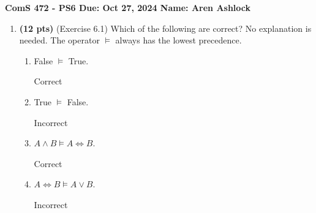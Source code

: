 \documentclass{article}
\begin{document}
\noindent\textbf{ComS 472 - PS6 \quad Due: Oct 27, 2024 \quad Name: Aren Ashlock}

\begin{enumerate}


\item \textbf{(12 pts)} (Exercise 6.1) Which of the following are correct? No explanation is needed. The operator $\models$ always has the lowest precedence.

    \begin{enumerate}[label=($\alph*$)]


    \item False $\models$ True.

    \color{blue}
        Correct
    \color{black}



    \item True $\models$ False.

    \color{blue}
        Incorrect
    \color{black}



    \item $A \wedge B \models A \Leftrightarrow B$.

    \color{blue}
        Correct
    \color{black}



    \item $A \Leftrightarrow B \models A \vee B$.

    \color{blue}
        Incorrect
    \color{black}




\end{enumerate}
\end{enumerate}
\end{document}

